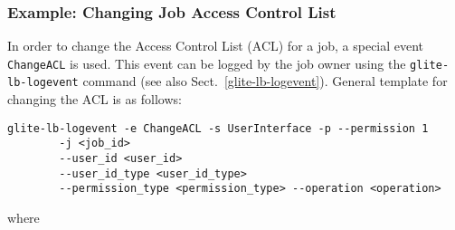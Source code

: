 %
%
%
%
\subsubsection{Example: Changing Job Access Control List}
\label{e:change-acl}

In order to change the Access Control List (ACL) for a job, a special event
\verb'ChangeACL' is used. This event can be logged by the job owner using the
\verb'glite-lb-logevent' command (see also Sect.~\ref{glite-lb-logevent}).
General template for changing the ACL is as follows:

\begin{verbatim}
glite-lb-logevent -e ChangeACL -s UserInterface -p --permission 1          
        -j <job_id>                                                     
        --user_id <user_id>                                             
        --user_id_type <user_id_type>                                   
        --permission_type <permission_type> --operation <operation>
\end{verbatim}

where

